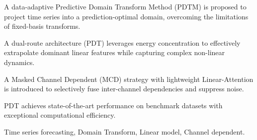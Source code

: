 \documentclass[final,3p,times]{elsarticle}
\begin{document}
\begin{frontmatter}
\begin{abstract}
While linear-based models offer inherent computational efficiency for Multivariate Time-Series Forecasting (MTSF), their limited capacity to represent complex non-linear temporal patterns remains a critical bottleneck. To overcome this, we propose a data-adaptive \textbf{Predictive Domain Transform Method (PDTM)}. Unlike fixed-basis transforms, PDTM projects time series into a prediction-optimal latent space characterized by energy concentration, explicitly minimizing prediction error and alleviating the representation burden on subsequent layers. Building upon this, we introduce \textbf{PDT}, a dual-route architecture comprising a Linear-Route that extrapolates dominant features via Top-K components, and an Encoder-Route that captures complex non-linear dynamics. Furthermore, to address inter-variate dependencies, we propose a \textbf{Masked Channel Dependent (MCD)} strategy implemented via a lightweight Linear-Attention mechanism. MCD employs a distance-based masking strategy to effectively suppress noise from irrelevant channels while enhancing information fusion among strongly correlated variates. Extensive experiments on real-world datasets demonstrate that PDT achieves state-of-the-art performance, achieving a superior balance between forecasting accuracy and computational efficiency.
\end{abstract}


\begin{highlights}
\item A data-adaptive Predictive Domain Transform Method (PDTM) is proposed to project time series into a prediction-optimal domain, overcoming the limitations of fixed-basis transforms.
\item A dual-route architecture (PDT) leverages energy concentration to effectively extrapolate dominant linear features while capturing complex non-linear dynamics.
\item A Masked Channel Dependent (MCD) strategy with lightweight Linear-Attention is introduced to selectively fuse inter-channel dependencies and suppress noise.
\item PDT achieves state-of-the-art performance on benchmark datasets with exceptional computational efficiency.
\end{highlights}

\begin{keyword}
Time series forecasting, %
Domain Transform,
Linear model,
Channel dependent.


\end{keyword}

\end{frontmatter}
\end{document}
